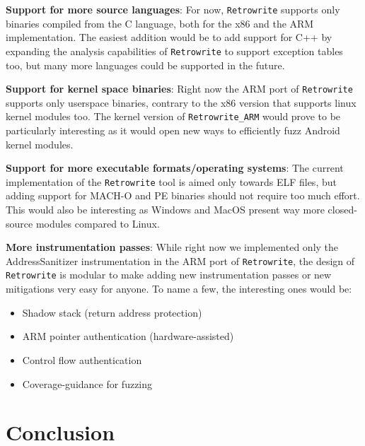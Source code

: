 \documentclass[a4paper,11pt,oneside]{report}
\begin{document}
{

\setlength{\parindent}{0cm}
\hangindent=0.7cm \textbf{Support for more source languages}: For now, 
\texttt{Retrowrite} supports only binaries compiled from the C language, both 
for the x86 and the ARM implementation. The easiest addition would be to add 
support for C++ by expanding the analysis capabilities of \texttt{Retrowrite} 
to support exception tables too, but many more languages could be supported in 
the future. 

\hangindent=0.7cm \textbf{Support for kernel space binaries}: Right now the ARM 
port of \texttt{Retrowrite} supports only userspace binaries, contrary to the 
x86 version that supports linux kernel modules too. The kernel version of 
\texttt{Retrowrite\_ARM} would prove to be particularly interesting as it would 
open new ways to efficiently fuzz Android kernel modules.

\hangindent=0.7cm \textbf{Support for more executable formats/operating 
systems}: The current implementation of the \texttt{Retrowrite} tool is aimed 
only towards ELF files, but adding support for MACH-O and PE binaries should 
not require too much effort. This would also be interesting as Windows and 
MacOS present way more closed-source modules compared to Linux.

\hangindent=0.7cm \textbf{More instrumentation passes}: While right now we 
implemented only the AddressSanitizer instrumentation in the ARM port of
\texttt{Retrowrite}, the design of \texttt{Retrowrite} is modular to make
adding new instrumentation passes or new mitigations very easy for anyone. To
name a few, the interesting ones would be:
\begin{itemize}
	\item Shadow stack (return address protection)
	\item ARM pointer authentication (hardware-assisted)
	\item Control flow authentication
	\item Coverage-guidance for fuzzing
\end{itemize}

}

\chapter{Conclusion}

\end{document}
